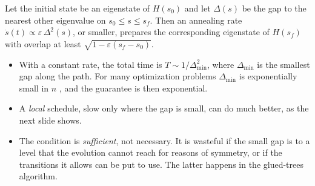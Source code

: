 \documentclass[handoutsbeamer.tex]{subfiles}
\begin{document}
\begin{frame}
\onp{\footnotesize}
\begin{thm}\label{thm:ch04:adiabatic}
Let the initial state be an eigenstate of $H(s_0)$ and let $\Delta(s)$ be the gap to the nearest other eigenvalue on $s_0 \le s \le s_f$. Then an annealing rate $\dot s(t) \propto \varepsilon\,\Delta^2(s)$, or smaller, prepares the corresponding eigenstate of $H(s_f)$ with overlap at least $\sqrt{1-\varepsilon(s_f - s_0)}$.
\end{thm}
\begin{itemize}\setlength\itemsep{0.25em}
    \item With a constant rate, the total time is $T \sim 1/\Delta_{\min}^2$, where $\Delta_{\min}$ is the smallest gap along the path. For many optimization problems $\Delta_{\min}$ is exponentially small in $n$ \citep{vandam2001powerful,altshuler2010anderson}, and the guarantee is then exponential.
    \item A \emph{local} schedule, slow only where the gap is small, can do much better, as the next slide shows.
    \item The condition is \emph{sufficient}, not necessary. It is wasteful if the small gap is to a level that the evolution cannot reach for reasons of symmetry, or if the transitions it allows can be put to use. The latter happens in the glued-trees algorithm.
\end{itemize}
\end{frame}
\end{document}
